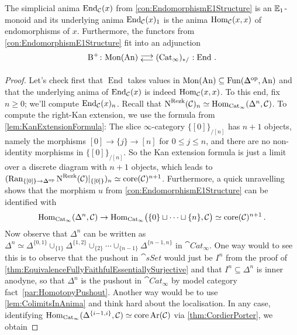 \begin{lem}\label{lem:B+EndAdjunction}
	The simplicial anima $\operatorname{End}_{\mathcal{C}}(x)$ from \cref{con:EndomorphismE1Structure} is an $\mathbb{E}_1$-monoid and its underlying anima $\operatorname{End}_{\mathcal{C}}(x)_1$ is the anima $\operatorname{Hom}_{\mathcal{C}}(x,x)$ of endomorphisms of $x$. Furthermore, the functors from \cref{con:EndomorphismE1Structure} fit into an adjunction
	\begin{equation*}
		\B^+\colon \cat{Mon}(\cat{An})\doublelrmorphism (\cat{Cat}_\infty)_{*/}\noloc \operatorname{End}\,.
	\end{equation*}
\end{lem}
\begin{proof}
	Let's check first that $\operatorname{End}$ takes values in $\cat{Mon}(\cat{An})\subseteq\Fun(\IDelta^\op,\cat{An})$ and that the underlying anima of $\operatorname{End}_{\mathcal{C}}(x)$ is indeed $\operatorname{Hom}_{\mathcal{C}}(x,x)$. To this end, fix $n\geqslant 0$; we'll compute $\operatorname{End}_{\mathcal{C}}(x)_n$. Recall that $\operatorname{N}^\mathrm{Rezk}(\mathcal{C})_n\simeq \operatorname{Hom}_{\mathrm{Cat}_\infty}(\Delta^n,\mathcal{C})$. To compute the right-Kan extension, we use the formula from \cref{lem:KanExtensionFormula}: The slice $\infty$-category $\{[0]\}_{/[n]}$ has $n+1$ objects, namely the morphisms $[0]\rightarrow\{j\}\rightarrow [n]$ for $0\leqslant j\leqslant n$, and there are no non-identity morphisms in $\{[0]\}_{/[n]}$. So the Kan extension formula is just a limit over a discrete diagram with $n+1$ objects, which leads to $(\Ran_{\{[0]\}\rightarrow \IDelta^\op}\N^\mathrm{Rezk}(\Cc)|_{\{[0]\}})_n\simeq \core (\Cc)^{n+1}$. Furthermore, a quick unravelling shows that the morphism $u$ from \cref{con:EndomorphismE1Structure} can be identified with 
	\begin{equation*}
		\Hom_{\cat{Cat}_\infty}(\Delta^n,\Cc)\rightarrow\Hom_{\cat{Cat}_\infty}\lef(\{0\}\sqcup\dotsb\sqcup\{n\},\Cc\righ)\simeq \core(\Cc)^{n+1}\,.
	\end{equation*}
	Now observe that $\Delta^n$ can be written as $\Delta^n\simeq \Delta^{\{0,1\}}\cup_{\{1\}}\Delta^{\{1,2\}}\cup_{\{2\}}\dotsb\cup_{\{n-1\}}\Delta^{\{n-1,n\}}$ in $\cat{Cat}_\infty$. One way would to see this is to observe that the pushout in $\cat{sSet}$ would just be $I^n$ from the proof of \cref{thm:EquivalenceFullyFaithfulEssentiallySurjective} and that $I^n\subseteq \Delta^n$ is inner anodyne, so that $\Delta^n$ is the pushout in $\cat{Cat}_\infty$ by model category fact~\cref{par:HomotopyPushout}. Another way would be to use \cref{lem:ColimitsInAnima} and think hard about the localisation. In any case, identifying $\operatorname{Hom}_{\mathrm{Cat}_\infty}(\Delta^{\{i-1,i\}},\mathcal{C})\simeq \operatorname{core} \operatorname{Ar}(\mathcal{C})$ via \cref{thm:CordierPorter}, we obtain

\end{proof}

